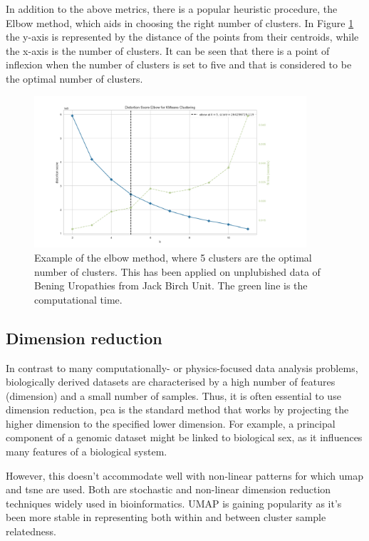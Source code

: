 In addition to the above metrics, there is a popular heuristic procedure, the Elbow method, which aids in choosing the right number of clusters. In Figure \ref{fig:elbow_method} the y-axis is represented by the distance of the points from their centroids, while the x-axis is the number of clusters. It can be seen that there is a point of inflexion when the number of clusters is set to five and that is considered to be the optimal number of clusters.

\begin{figure}[!htb]
  \centering\includegraphics[width=0.9\textwidth,height=0.5\textheight,keepaspectratio]{Images/Clustering/elbow_method.png}
    \caption{Example of the elbow method, where 5 clusters are the optimal number of clusters. This has been applied on unplubished data of Bening Uropathies from Jack Birch Unit. The green line is the computational time. }
    \label{fig:elbow_method}
\end{figure}
\FloatBarrier


\subsection{Dimension reduction} \label{s:dim_red}

In contrast to many computationally- or physics-focused data analysis problems, biologically derived datasets are characterised by a high number of features (dimension) and a small number of samples. Thus, it is often essential to use dimension reduction, \acrfull{pca} is the standard method that works by projecting the higher dimension to the specified lower dimension. For example, a principal component of a genomic dataset might be linked to biological sex, as it influences many features of a biological system.

However, this doesn't accommodate well with non-linear patterns for which \acrfull{umap} and \acrfull{tsne} are used. Both are stochastic and non-linear dimension reduction techniques widely used in bioinformatics. UMAP is gaining popularity as it's been more stable in representing both within and between cluster sample relatedness.

